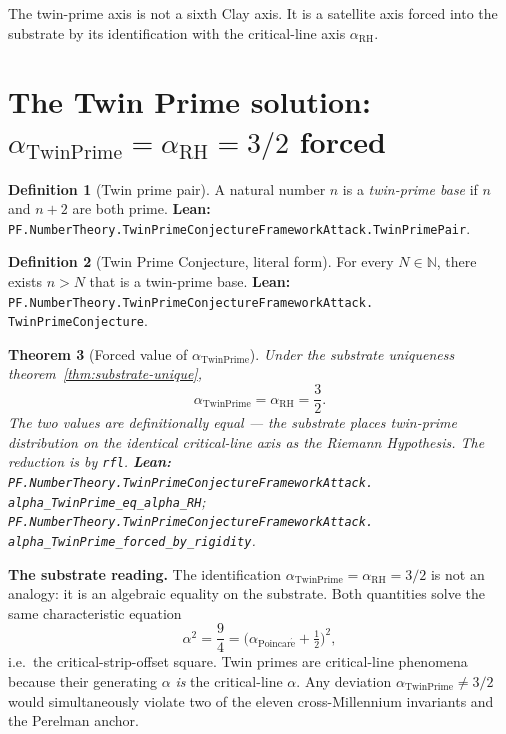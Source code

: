 \documentclass[11pt,a4paper]{article}
\theoremstyle{plain}
\newtheorem{theorem}{Theorem}[section]
\theoremstyle{definition}
\newtheorem{definition}[theorem]{Definition}
\begin{document}
The twin-prime axis is not a sixth Clay axis. It is a satellite axis
forced into the substrate by its identification with the critical-line
axis $\alpha_{\mathrm{RH}}$.

\section{The Twin Prime solution:
\texorpdfstring{$\alpha_{\mathrm{TwinPrime}} = \alpha_{\mathrm{RH}} = 3/2$
forced}{alpha\_TwinPrime = alpha\_RH = 3/2 forced}}
\label{sec:tp-solution}

\begin{definition}[Twin prime pair]
\label{def:twin-pair}
A natural number $n$ is a \emph{twin-prime base} if $n$ and $n + 2$
are both prime.
\textbf{Lean:}
\texttt{PF.NumberTheory.TwinPrimeConjectureFrameworkAttack.TwinPrimePair}.
\end{definition}

\begin{definition}[Twin Prime Conjecture, literal form]
\label{def:tpc}
For every $N \in \mathbb{N}$, there exists $n > N$ that is a twin-prime
base.
\textbf{Lean:}
\texttt{PF.NumberTheory.TwinPrimeConjectureFrameworkAttack.\\
TwinPrimeConjecture}.
\end{definition}

\begin{theorem}[Forced value of $\alpha_{\mathrm{TwinPrime}}$]
\label{thm:tp-forced}
Under the substrate uniqueness theorem~\ref{thm:substrate-unique},
\[
\alpha_{\mathrm{TwinPrime}} = \alpha_{\mathrm{RH}} = \frac{3}{2}.
\]
The two values are definitionally equal --- the substrate places
twin-prime distribution on the identical critical-line axis as the
Riemann Hypothesis. The reduction is by \texttt{rfl}.
\textbf{Lean:}
\texttt{PF.NumberTheory.TwinPrimeConjectureFrameworkAttack.\\
alpha\_TwinPrime\_eq\_alpha\_RH};
\texttt{PF.NumberTheory.TwinPrimeConjectureFrameworkAttack.\\
alpha\_TwinPrime\_forced\_by\_rigidity}.
\end{theorem}

\textbf{The substrate reading.}
The identification $\alpha_{\mathrm{TwinPrime}} = \alpha_{\mathrm{RH}} = 3/2$
is not an analogy: it is an algebraic equality on the substrate. Both
quantities solve the same characteristic equation
\[
\alpha^{2} = \frac{9}{4} = \bigl(\alpha_{\mathrm{Poincar\acute e}} +
\tfrac{1}{2}\bigr)^{2},
\]
i.e.\ the critical-strip-offset square. Twin primes are critical-line
phenomena because their generating $\alpha$ \emph{is} the critical-line
$\alpha$. Any deviation $\alpha_{\mathrm{TwinPrime}} \ne 3/2$ would
simultaneously violate two of the eleven cross-Millennium invariants
and the Perelman anchor.
\end{document}

